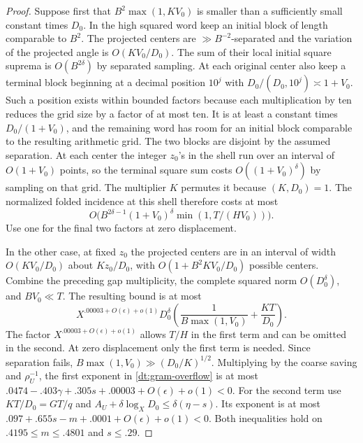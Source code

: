 \documentclass[11pt,a4paper]{article}
\theoremstyle{paperplain}
\numberwithin{equation}{section}
\begin{document}
\begin{proof}
Suppose first that
\(B^2\max(1,KV_0)\) is smaller than a sufficiently small
constant times \(D_0\). In the high squared word keep
an initial block of length comparable to \(B^2\).
The projected centers are \( \gg B^{-2}\)-separated and
the variation of the projected angle is \(O(KV_0/D_0)\).
The sum of their local initial square suprema is
\(O(B^{2\delta})\) by separated sampling.
At each original center also keep a terminal block
beginning at a decimal position \(10^j\) with
\(D_0/(D_0,10^j)\asymp 1+V_0\). Such a position exists
within bounded factors because each multiplication by
ten reduces the grid size by a factor of at most ten.
It is at least a constant times \(D_0/(1+V_0)\),
and the remaining word has room for an initial block
comparable to the resulting arithmetic grid.
The two blocks are disjoint by the assumed separation.
At each center the integer \(z_0\)'s in the shell run over
an interval of \(O(1+V_0)\) points, so the terminal square
sum costs \(O((1+V_0)^\delta)\) by sampling on that grid.
The multiplier \(K\) permutes it because \((K,D_0)=1\).
The normalized folded incidence at this shell therefore
costs at most
\begin{equation}
        O\bigl(B^{2\delta-1}(1+V_0)^\delta
                              \min(1,T/(HV_0))\bigr).
 \label{dt:gram-separated}
\end{equation}
Use one for the final two factors at zero displacement.

In the other case, at fixed \(z_0\) the projected centers
are in an interval of width \(O(KV_0/D_0)\) about
\(Kz_0/D_0\), with \(O(1+B^2KV_0/D_0)\) possible
centers. Combine the preceding gap multiplicity, the
complete squared norm \(O(D_0^\delta)\), and \(BV_0\ll T\).
The resulting bound is at most
\begin{equation}
 X^{.00003+O(\epsilon)+o(1)}D_0^\delta
          \left(\frac{1}{B\max(1,V_0)}+\frac{KT}{D_0}\right).
 \label{dt:gram-overflow}
\end{equation}
The factor \(X^{.00003+O(\epsilon)+o(1)}\) allows
\(T/H\) in the first term and can be omitted in the second.
At zero displacement only the first term is needed.
Since separation fails, \(B\max(1,V_0)\gg(D_0/K)^{1/2}\).
Multiplying by the coarse saving and \(\rho_U^{-1}\),
the first exponent in \eqref{dt:gram-overflow} is at most
\(.0474-.403\gamma+.305s+.00003+O(\epsilon)+o(1)<0\).
For the second term use \(KT/D_0=GT/q\) and
\(A_U+\delta\log_XD_0\le\delta(\eta-s)\).
Its exponent is at most
\(.097+.655s-m+.0001+O(\epsilon)+o(1)<0\).
Both inequalities hold on \(.4195\le m\le.4801\)
and \(s\le.29\).


\end{proof}
\end{document}
